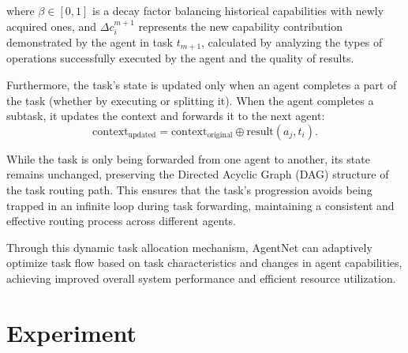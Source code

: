 \documentclass{article}
\begin{document}
where $\beta \in [0,1]$ is a decay factor balancing historical capabilities with newly acquired ones, and $\Delta c_i^{m+1}$ represents the new capability contribution demonstrated by the agent in task $t_{m+1}$, calculated by analyzing the types of operations successfully executed by the agent and the quality of results.

Furthermore, the task's state is updated only when an agent completes a part of the task (whether by executing or splitting it). When the agent completes a subtask, it updates the context and forwards it to the next agent:
\begin{equation}
\text{context}_{\text{updated}} = \text{context}_{\text{original}} \oplus \text{result}(a_j, t_i).
\end{equation}

While the task is only being forwarded from one agent to another, its state remains unchanged, preserving the Directed Acyclic Graph (DAG) structure of the task routing path. This ensures that the task's progression avoids being trapped in an infinite loop during task forwarding, maintaining a consistent and effective routing process across different agents.

Through this dynamic task allocation mechanism, AgentNet can adaptively optimize task flow based on task characteristics and changes in agent capabilities, achieving improved overall system performance and efficient resource utilization.











\section{Experiment}
\end{document}
